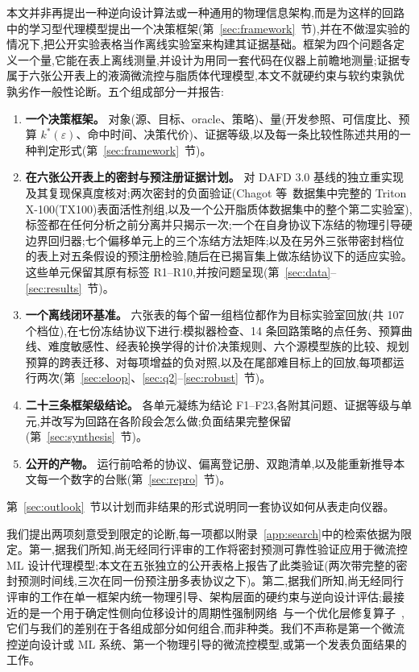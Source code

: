 \documentclass[11pt,a4paper]{ctexart}
\newcommand{\tox}{TX100}
\begin{document}
本文并非再提出一种逆向设计算法或一种通用的物理信息架构,而是为这样的回路中的学习型代理模型提出一个决策框架(第~\ref{sec:framework}~节),并在不做湿实验的情况下,把公开实验表格当作离线实验室来构建其证据基础。框架为四个问题各定义一个量,它能在表上离线测量,并设计为用同一套代码在仪器上前瞻地测量;证据专属于六张公开表上的液滴微流控与脂质体代理模型,本文不就硬约束与软约束孰优孰劣作一般性论断。五个组成部分一并报告:

\begin{enumerate}[leftmargin=*,itemsep=2pt]
\item \textbf{一个决策框架。} 对象(源、目标、oracle、策略)、量(开发参照、可信度比、预算 $k^{*}(\varepsilon)$、命中时间、决策代价)、证据等级,以及每一条比较性陈述共用的一种判定形式(第~\ref{sec:framework}~节)。
\item \textbf{在六张公开表上的密封与预注册证据计划。} 对 DAFD 3.0 基线的独立重实现及其复现保真度核对;两次密封的负面验证(Chagot 等~\cite{chagot2022}数据集中完整的 Triton X-100(\tox{})表面活性剂组,以及一个公开脂质体数据集中的整个第二实验室),标签都在任何分析之前分离并只揭示一次;一个在自身协议下冻结的物理引导硬边界回归器;七个偏移单元上的三个冻结方法矩阵;以及在另外三张带密封档位的表上对五条假设的预注册检验,随后在已揭盲集上做冻结协议下的适应实验。这些单元保留其原有标签 R1--R10,并按问题呈现(第~\ref{sec:data}--\ref{sec:results}~节)。
\item \textbf{一个离线闭环基准。} 六张表的每个留一组档位都作为目标实验室回放(共 107 个档位),在七份冻结协议下进行:模拟器检查、14 条回路策略的点任务、预算曲线、难度敏感性、经表轮换学得的计价决策规则、六个源模型族的比较、规划预算的跨表迁移、对每项增益的负对照,以及在尾部难目标上的回放,每项都运行两次(第~\ref{sec:eloop}、\ref{sec:q2}--\ref{sec:robust}~节)。
\item \textbf{二十三条框架级结论。} 各单元凝练为结论 F1--F23,各附其问题、证据等级与单元,并改写为回路在各阶段会怎么做;负面结果完整保留(第~\ref{sec:synthesis}~节)。
\item \textbf{公开的产物。} 运行前哈希的协议、偏离登记册、双跑清单,以及能重新推导本文每一个数字的台账(第~\ref{sec:repro}~节)。
\end{enumerate}

第~\ref{sec:outlook}~节以计划而非结果的形式说明同一套协议如何从表走向仪器。

我们提出两项刻意受到限定的论断,每一项都以附录~\ref{app:search}中的检索依据为限定。第一,据我们所知,尚无经同行评审的工作将密封预测可靠性验证应用于微流控 ML 设计代理模型;本文在五张独立的公开表格上报告了此类验证(两次带完整的密封预测时间线,三次在同一份预注册多表协议之下)。第二,据我们所知,尚无经同行评审的工作在单一框架内统一物理引导、架构层面的硬约束与逆向设计评估;最接近的是一个用于确定性侧向位移设计的周期性强制网络~\cite{lee2025}与一个优化层修复算子~\cite{micromixer2026},它们与我们的差别在于各组成部分如何组合,而非种类。我们不声称是第一个微流控逆向设计或 ML 系统、第一个物理引导的微流控模型,或第一个发表负面结果的工作。
\end{document}
